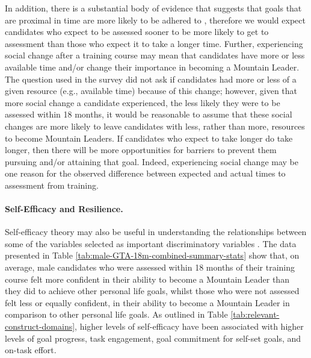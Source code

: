 \documentclass[
  12pt,
  a4paper,
]{book}
\begin{document}
In addition, there is a substantial body of evidence that suggests that goals that are proximal in time are more likely to be adhered to \citep[see][]{Hardy1996, Weinberg2014}, therefore we would expect candidates who expect to be assessed sooner to be more likely to get to assessment than those who expect it to take a longer time. Further, experiencing social change after a training course may mean that candidates have more or less available time and/or change their importance in becoming a Mountain Leader. The question used in the survey did not ask if candidates had more or less of a given resource (e.g., available time) because of this change; however, given that more social change a candidate experienced, the less likely they were to be assessed within 18 months, it would be reasonable to assume that these social changes are more likely to leave candidates with less, rather than more, resources to become Mountain Leaders. If candidates who expect to take longer do take longer, then there will be more opportunities for barriers to prevent them pursuing and/or attaining that goal. Indeed, experiencing social change may be one reason for the observed difference between expected and actual times to assessment from training.

\hypertarget{ml-pra-gta-male-self-efficacy-resilience}{%
\paragraph{Self-Efficacy and Resilience.}\label{ml-pra-gta-male-self-efficacy-resilience}}

Self-efficacy theory \citep{Bandura1977, Bandura1982} may also be useful in understanding the relationships between some of the variables selected as important discriminatory variables \citep[n.b.,][ suggested that perceived behavioural control is similar to the construct of self-efficacy]{Ajzen1991}. The data presented in Table \ref{tab:male-GTA-18m-combined-summary-stats} show that, on average, male candidates who were assessed within 18 months of their training course felt more confident in their ability to become a Mountain Leader than they did to achieve other personal life goals, whilst those who were not assessed felt less or equally confident, in their ability to become a Mountain Leader in comparison to other personal life goals. As outlined in Table \ref{tab:relevant-construct-domains}, higher levels of self-efficacy have been associated with higher levels of goal progress, task engagement, goal commitment for self-set goals, and on-task effort.
\end{document}
